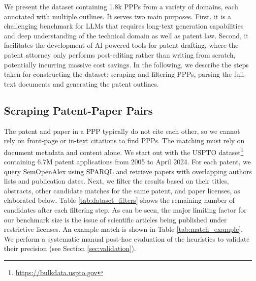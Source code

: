 We present the \DatasetName dataset containing 1.8k PPPs from a variety of domains, each annotated with multiple outlines.
It serves two main purposes.
First, it is a challenging benchmark for LLMs that requires long-text generation capabilities and deep understanding of the technical domain as well as patent law. Second, it facilitates the development of AI-powered tools for patent drafting, where the patent attorney only performs post-editing rather than writing from scratch, potentially incurring massive cost savings. In the following, we describe the steps taken for constructing the \DatasetName{} dataset: scraping and filtering PPPs, parsing the full-text documents and generating the patent outlines.

\subsection{Scraping Patent-Paper Pairs}\label{sec:matching}

The patent and paper in a PPP typically do not cite each other, so we cannot rely on front-page or in-text citations \cite{marxRelianceScienceWorldwide2020, marxRelianceScienceInventors2022} to find PPPs. 
The matching must rely on document metadata and content alone. 
We start out with the USPTO dataset\footnote{\url{https://bulkdata.uspto.gov}} containing 6.7M patent applications from 2005 to April 2024.
For each patent, we query SemOpenAlex \cite{farberSemOpenAlexScientificLandscape2023a} using SPARQL and retrieve papers with overlapping authors lists and publication dates.
Next, we filter the results based on their titles, abstracts, other candidate matches for the same patent, and %
paper licenses, as elaborated below. Table \ref{tab:dataset_filters} shows the remaining number of candidates after each filtering step.
As can be seen, the major limiting factor for our benchmark size is the issue of scientific articles being published under restrictive licenses.
An example match is shown in Table \ref{tab:match_example}.
We perform a systematic manual post-hoc evaluation of the heuristics to validate their precision (see Section \ref{sec:validation}).


